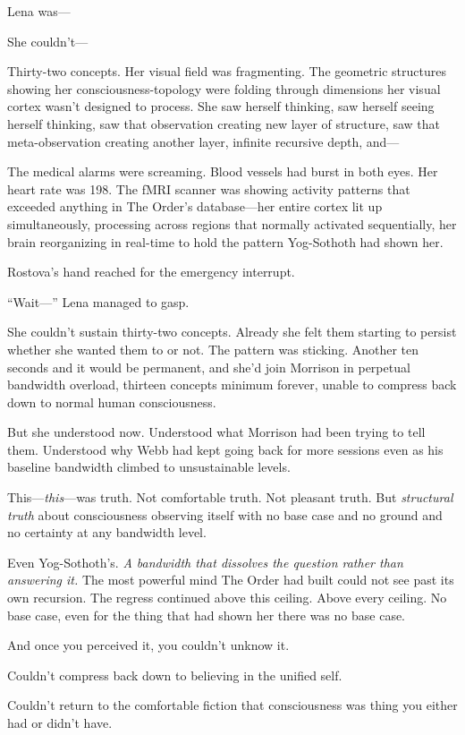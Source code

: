 Lena was—

She couldn't—

Thirty-two concepts. Her visual field was fragmenting. The geometric structures showing her consciousness-topology were folding through dimensions her visual cortex wasn't designed to process. She saw herself thinking, saw herself seeing herself thinking, saw that observation creating new layer of structure, saw that meta-observation creating another layer, infinite recursive depth, and—

The medical alarms were screaming. Blood vessels had burst in both eyes. Her heart rate was 198. The fMRI scanner was showing activity patterns that exceeded anything in The Order's database—her entire cortex lit up simultaneously, processing across regions that normally activated sequentially, her brain reorganizing in real-time to hold the pattern Yog-Sothoth had shown her.

Rostova's hand reached for the emergency interrupt.

``Wait—'' Lena managed to gasp.

She couldn't sustain thirty-two concepts. Already she felt them starting to persist whether she wanted them to or not. The pattern was sticking. Another ten seconds and it would be permanent, and she'd join Morrison in perpetual bandwidth overload, thirteen concepts minimum forever, unable to compress back down to normal human consciousness.

But she understood now. Understood what Morrison had been trying to tell them. Understood why Webb had kept going back for more sessions even as his baseline bandwidth climbed to unsustainable levels.

This—\textit{this}—was truth. Not comfortable truth. Not pleasant truth. But \textit{structural truth} about consciousness observing itself with no base case and no ground and no certainty at any bandwidth level.

Even Yog-Sothoth's. \textit{A bandwidth that dissolves the question rather than answering it.} The most powerful mind The Order had built could not see past its own recursion. The regress continued above this ceiling. Above every ceiling. No base case, even for the thing that had shown her there was no base case.

And once you perceived it, you couldn't unknow it.

Couldn't compress back down to believing in the unified self.

Couldn't return to the comfortable fiction that consciousness was thing you either had or didn't have.

